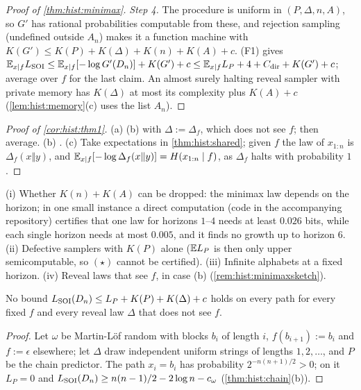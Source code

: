 \begin{proof}[Proof of \cref{thm:hist:minimax}]
\emph{Step 4.} The procedure is uniform in $(P,\Delta,n,A)$, so $G'$ has rational probabilities computable from these, and rejection sampling (undefined outside $A_n$) makes it a function machine with $K(G')\le K(P)+K(\Delta)+K(n)+K(A)+c$. (F1) gives $\mathbb{E}_{x\mid f}L_{\mathrm{SOI}}\le\mathbb{E}_{x\mid f}[-\log G'(D_n)]+K(G')+c\le\mathbb{E}_{x\mid f}L_P+4+C_{\rm dir}+K(G')+c$; average over $f$ for the last claim. An almost surely halting reveal sampler with private memory has $K(\Delta)$ at most its complexity plus $K(A)+c$ (\cref{lem:hist:memory}(c) uses the list $A_n$).
\end{proof}

\begin{proof}[Proof of \cref{cor:hist:thm1}]
(a) (b) with $\Delta:=\Delta_f$, which does not see $f$; then average. (b) . (c) Take expectations in \cref{thm:hist:shared}; given $f$ the law of $x_{1:n}$ is $\Delta_f(x\Vert y)$, and $\mathbb{E}_{x\mid f}[-\log\Delta_f(x\Vert y)]=H(x_{1:n}\mid f)$, as $\Delta_f$ halts with probability $1$.
\end{proof}

\begin{remark}\label{rem:hist:thm1open}
(i) Whether $K(n)+K(A)$ can be dropped: the minimax law depends on the horizon; in one small instance a direct computation (code in the accompanying repository) certifies that one law for horizons $1$--$4$ needs at least $0.026$ bits, while each single horizon needs at most $0.005$, and it finds no growth up to horizon $6$. (ii) Defective samplers with $K(P)$ alone ($\mathbb{E} L_P$ is then only upper semicomputable, so $(\star)$ cannot be certified). (iii) Infinite alphabets at a fixed horizon. (iv) Reveal laws that see $f$, in case (b) (\cref{rem:hist:minimaxsketch}).
\end{remark}

\begin{proposition}\label{prop:hist:nopathwise}
No bound $L_{\mathrm{SOI}}(D_n)\le L_P+K(P)+K(\Delta)+c$ holds on every path for every fixed $f$ and every reveal law $\Delta$ that does not see $f$.
\end{proposition}

\begin{proof}
Let $\omega$ be Martin-L\"of random with blocks $b_i$ of length $i$, $f(b_{i+1}):=b_i$ and $f:=\epsilon$ elsewhere; let $\Delta$ draw independent uniform strings of lengths $1,2,\dots$, and $P$ be the chain predictor. The path $x_i=b_i$ has probability $2^{-n(n+1)/2}>0$; on it $L_P=0$ and $L_{\mathrm{SOI}}(D_n)\ge n(n-1)/2-2\log n-c_\omega$ (\cref{thm:hist:chain}(b)).
\end{proof}

